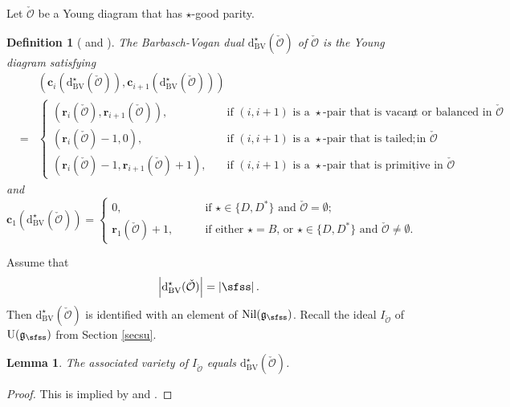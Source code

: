 \documentclass[12pt,a4paper]{amsart}
\def\abs#1{\left|{#1}\right|}
\newcommand{\CO}{{\mathcal {O}}}
\newcommand{\oU}{\operatorname{U}}
\newcommand{\g}{\mathfrak g}
\numberwithin{equation}{section}
\newtheorem{lem}[thm]{Lemma}
\newtheorem{defn}[thm]{Definition}
\theoremstyle{remark}
\begin{document}
Let $\check \CO$ be a Young diagram that has $\star$-good parity.

\begin{defn}[\cite{BVUni} and \cite{BMSZ1}]\label{bvdual0}
The  Barbasch-Vogan dual $\mathrm d_{\mathrm{BV}}^\star(\check \CO)$ of $\check \CO$ is the Young diagram satisfying
\begin{eqnarray*}
 &&\left (\mathbf c_i(\mathrm d_{\mathrm{BV}}^\star(\check \CO)), \mathbf c_{i+1}(\mathrm d_{\mathrm{BV}}^\star(\check \CO))\right )\\
  &=&\begin{cases}
      (\mathbf r_i(\check \CO), \mathbf r_{i+1}(\check \CO)),\quad& \textrm{if  $(i,i+1)$ is a $\star$-pair that is vacant or balanced in $\check \CO$};  \\
        (\mathbf r_i(\check \CO)-1, 0),\quad& \textrm{if  $(i,i+1)$ is a $\star$-pair that is  tailed in $\check \CO$};  \\
         (\mathbf r_i(\check \CO)-1, \mathbf r_{i+1}(\check \CO)+1),\quad& \textrm{if  $(i,i+1)$ is a $\star$-pair that is primitive in $\check \CO$},
  \end{cases}
  \end{eqnarray*}
and
\[
    \mathbf c_1(\mathrm d_{\mathrm{BV}}^\star(\check \CO))=\begin{cases}
      0,\qquad& \textrm{if  $\star\in \{D, D^*\}$ and $\check \CO=\emptyset$};  \\
       \mathbf r_1(\check \CO)+1, \qquad& \textrm{if  either $\star=B$, or $\star\in \{D, D^*\}$ and $\check \CO\neq \emptyset$.}
          \end{cases}
\]

\end{defn}

Assume that
\[
 \abs{\mathrm d_{\mathrm{BV}}^\star(\check \CO)}=\abs{\sfss}.
\]
Then  $\mathrm d_{\mathrm{BV}}^\star(\check \CO)$ is identified with an element of $\mathrm{Nil}(\g_\sfss)$.
Recall  the ideal $I_{\check \CO}$ of $\oU(\g_\sfss)$ from Section \ref{secsu}.


\begin{lem}\label{bvdual}
The  associated variety of $I_{\check \CO}$ equals   $\mathrm d_{\mathrm{BV}}^\star(\check \CO)$.
\end{lem}
\begin{proof}
This is implied by \cite[Corollary A3]{BVUni} and \cite[Theorem B]{BMSZ1}.
\end{proof}
\end{document}
